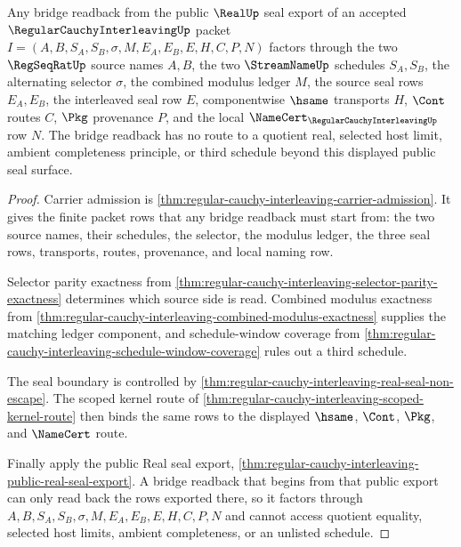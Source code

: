 \begin{theorem}
\label{thm:regular-cauchy-interleaving-bridge-readback-scope}
Any bridge readback from the public $\RealUp$ seal export of an accepted $\RegularCauchyInterleavingUp$ packet $I=(A,B,S_A,S_B,\sigma,M,E_A,E_B,E,H,C,P,N)$ factors through the two $\RegSeqRatUp$ source names $A,B$, the two $\StreamNameUp$ schedules $S_A,S_B$, the alternating selector $\sigma$, the combined modulus ledger $M$, the source seal rows $E_A,E_B$, the interleaved seal row $E$, componentwise $\hsame$ transports $H$, $\Cont$ routes $C$, $\Pkg$ provenance $P$, and the local $\NameCert_{\RegularCauchyInterleavingUp}$ row $N$. The bridge readback has no route to a quotient real, selected host limit, ambient completeness principle, or third schedule beyond this displayed public seal surface.
\end{theorem}
\begin{proof}
Carrier admission is \autoref{thm:regular-cauchy-interleaving-carrier-admission}. It gives the finite packet rows that any bridge readback must start from: the two source names, their schedules, the selector, the modulus ledger, the three seal rows, transports, routes, provenance, and local naming row.

Selector parity exactness from \autoref{thm:regular-cauchy-interleaving-selector-parity-exactness} determines which source side is read. Combined modulus exactness from \autoref{thm:regular-cauchy-interleaving-combined-modulus-exactness} supplies the matching ledger component, and schedule-window coverage from \autoref{thm:regular-cauchy-interleaving-schedule-window-coverage} rules out a third schedule.

The seal boundary is controlled by \autoref{thm:regular-cauchy-interleaving-real-seal-non-escape}. The scoped kernel route of \autoref{thm:regular-cauchy-interleaving-scoped-kernel-route} then binds the same rows to the displayed $\hsame$, $\Cont$, $\Pkg$, and $\NameCert$ route.

Finally apply the public Real seal export, \autoref{thm:regular-cauchy-interleaving-public-real-seal-export}. A bridge readback that begins from that public export can only read back the rows exported there, so it factors through $A,B,S_A,S_B,\sigma,M,E_A,E_B,E,H,C,P,N$ and cannot access quotient equality, selected host limits, ambient completeness, or an unlisted schedule.
\end{proof}

